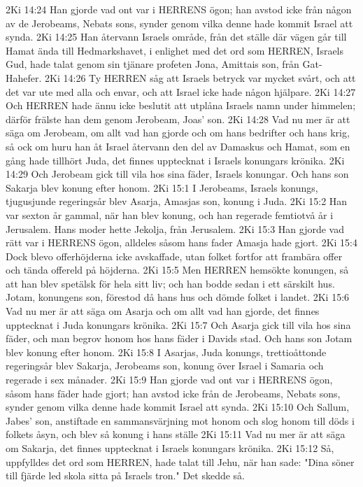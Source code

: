 2Ki 14:24  Han gjorde vad ont var i HERRENS ögon; han avstod icke från någon av de Jerobeams, Nebats sons, synder genom vilka denne hade kommit Israel att synda.
2Ki 14:25  Han återvann Israels område, från det ställe där vägen går till Hamat ända till Hedmarkshavet, i enlighet med det ord som HERREN, Israels Gud, hade talat genom sin tjänare profeten Jona, Amittais son, från Gat-Hahefer.
2Ki 14:26  Ty HERREN såg att Israels betryck var mycket svårt, och att det var ute med alla och envar, och att Israel icke hade någon hjälpare.
2Ki 14:27  Och HERREN hade ännu icke beslutit att utplåna Israels namn under himmelen; därför frälste han dem genom Jerobeam, Joas' son.
2Ki 14:28  Vad nu mer är att säga om Jerobeam, om allt vad han gjorde och om hans bedrifter och hans krig, så ock om huru han åt Israel återvann den del av Damaskus och Hamat, som en gång hade tillhört Juda, det finnes upptecknat i Israels konungars krönika.
2Ki 14:29  Och Jerobeam gick till vila hos sina fäder, Israels konungar. Och hans son Sakarja blev konung efter honom.
2Ki 15:1  I Jerobeams, Israels konungs, tjugusjunde regeringsår blev Asarja, Amasjas son, konung i Juda.
2Ki 15:2  Han var sexton år gammal, när han blev konung, och han regerade femtiotvå år i Jerusalem. Hans moder hette Jekolja, från Jerusalem.
2Ki 15:3  Han gjorde vad rätt var i HERRENS ögon, alldeles såsom hans fader Amasja hade gjort.
2Ki 15:4  Dock blevo offerhöjderna icke avskaffade, utan folket fortfor att frambära offer och tända offereld på höjderna.
2Ki 15:5  Men HERREN hemsökte konungen, så att han blev spetälsk för hela sitt liv; och han bodde sedan i ett särskilt hus. Jotam, konungens son, förestod då hans hus och dömde folket i landet.
2Ki 15:6  Vad nu mer är att säga om Asarja och om allt vad han gjorde, det finnes upptecknat i Juda konungars krönika.
2Ki 15:7  Och Asarja gick till vila hos sina fäder, och man begrov honom hos hans fäder i Davids stad. Och hans son Jotam blev konung efter honom.
2Ki 15:8  I Asarjas, Juda konungs, trettioåttonde regeringsår blev Sakarja, Jerobeams son, konung över Israel i Samaria och regerade i sex månader.
2Ki 15:9  Han gjorde vad ont var i HERRENS ögon, såsom hans fäder hade gjort; han avstod icke från de Jerobeams, Nebats sons, synder genom vilka denne hade kommit Israel att synda.
2Ki 15:10  Och Sallum, Jabes' son, anstiftade en sammansvärjning mot honom och slog honom till döds i folkets åsyn, och blev så konung i hans ställe
2Ki 15:11  Vad nu mer är att säga om Sakarja, det finnes upptecknat i Israels konungars krönika.
2Ki 15:12  Så, uppfylldes det ord som HERREN, hade talat till Jehu, när han sade: "Dina söner till fjärde led skola sitta på Israels tron." Det skedde så.
